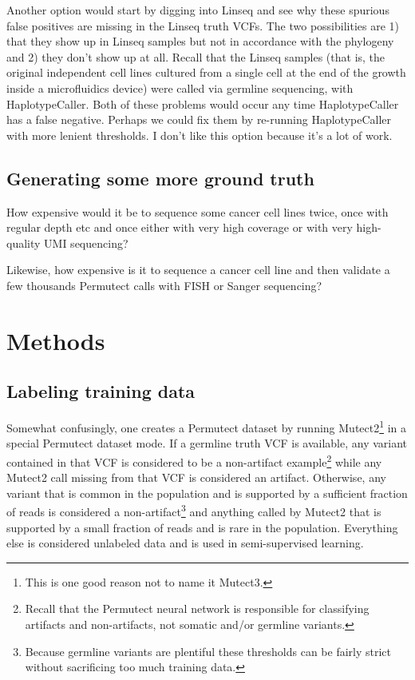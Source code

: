 \documentclass[times, twoside, watermark]{StyleBioRxiv}
\begin{document}
Another option would start by digging into Linseq and see why these spurious false positives are missing in the Linseq truth VCFs.  The two possibilities are 1) that they show up in Linseq samples but not in accordance with the phylogeny and 2) they don't show up at all.  Recall that the Linseq samples (that is, the original independent cell lines cultured from a single cell at the end of the growth inside a microfluidics device) were called via germline sequencing, with HaplotypeCaller.  Both of these problems would occur any time HaplotypeCaller has a false negative.  Perhaps we could fix them by re-running HaplotypeCaller with more lenient thresholds.  I don't like this option because it's a lot of work.

\subsection*{Generating some more ground truth}
How expensive would it be to sequence some cancer cell lines twice, once with regular depth etc and once either with very high coverage or with very high-quality UMI sequencing?

Likewise, how expensive is it to sequence a cancer cell line and then validate a few thousands Permutect calls with FISH or Sanger sequencing?

\section*{Methods}
\subsection*{Labeling training data} 
Somewhat confusingly, one creates a Permutect dataset by running Mutect2\footnote{This is one good reason not to name it Mutect3.} in a special Permutect dataset mode.  If a germline truth VCF is available, any variant contained in that VCF is considered to be a non-artifact example\footnote{Recall that the Permutect neural network is responsible for classifying artifacts and non-artifacts, not somatic and/or germline variants.} while any Mutect2 call missing from that VCF is considered an artifact.  Otherwise, any variant that is common in the population and is supported by a sufficient fraction of reads is considered a non-artifact\footnote{Because germline variants are plentiful these thresholds can be fairly strict without sacrificing too much training data.} and anything called by Mutect2 that is supported by a small fraction of reads and is rare in the population.  Everything else is considered unlabeled data and is used in semi-supervised learning.
\end{document}
